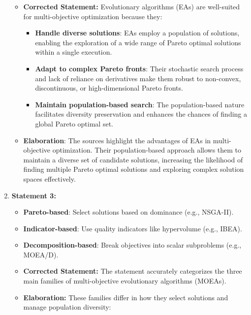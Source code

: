 \documentclass[
]{article}
\begin{document}
\begin{enumerate}
  \begin{itemize}
  
  \item
    \textbf{Corrected Statement:} Evolutionary algorithms (EAs) are
    well-suited for multi-objective optimization because they:

    \begin{itemize}
    
    \item
      \textbf{Handle diverse solutions}: EAs employ a population of
      solutions, enabling the exploration of a wide range of Pareto
      optimal solutions within a single execution.
    \item
      \textbf{Adapt to complex Pareto fronts}: Their stochastic search
      process and lack of reliance on derivatives make them robust to
      non-convex, discontinuous, or high-dimensional Pareto fronts.
    \item
      \textbf{Maintain population-based search}: The population-based
      nature facilitates diversity preservation and enhances the chances
      of finding a global Pareto optimal set.
    \end{itemize}
  \item
    \textbf{Elaboration}: The sources highlight the advantages of EAs in
    multi-objective optimization. Their population-based approach allows
    them to maintain a diverse set of candidate solutions, increasing
    the likelihood of finding multiple Pareto optimal solutions and
    exploring complex solution spaces effectively.
  \end{itemize}
\item
  \textbf{Statement 3:}

  \begin{itemize}
  \item
    \textbf{Pareto-based}: Select solutions based on dominance (e.g.,
    NSGA-II).
  \item
    \textbf{Indicator-based}: Use quality indicators like hypervolume
    (e.g., IBEA).
  \item
    \textbf{Decomposition-based}: Break objectives into scalar
    subproblems (e.g., MOEA/D).
  \item
    \textbf{Corrected Statement:} The statement accurately categorizes
    the three main families of multi-objective evolutionary algorithms
    (MOEAs).
  \item
    \textbf{Elaboration:} These families differ in how they select
    solutions and manage population diversity:


\end{itemize}
\end{enumerate}
\end{document}
